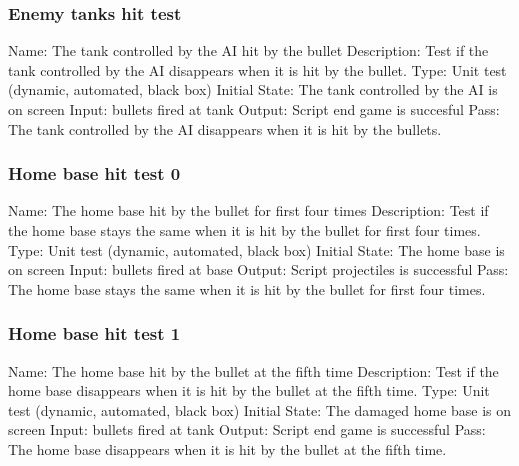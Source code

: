 \documentclass{article}
\begin{document}
\subsubsection{Enemy tanks hit test}
Name:  The tank controlled by the AI hit by the bullet\newline
Description: Test if the tank controlled by the AI disappears when it is hit 
by the bullet. \newline
Type: Unit test (dynamic, automated, black box) \newline
Initial State:  The tank controlled by the AI is on screen \newline
Input: bullets fired at tank\newline
Output: Script end game is succesful\newline
Pass: The tank controlled by the AI disappears when it is hit by the bullets.
\newline


\subsubsection{Home base hit test 0}
Name:  The home base hit by the bullet for first four times\newline
Description: Test if the home base stays the same when it is hit by the bullet 
for first four times. \newline
Type: Unit test (dynamic, automated, black box) \newline
Initial State:  The home base is on screen \newline
Input: bullets fired at base\newline
Output: Script projectiles is successful  \newline
Pass:  The home base stays the same when it is hit by the bullet for first 
four times. \newline


\subsubsection{Home base hit test 1}
Name: The home base hit by the bullet at the fifth time\newline
Description: Test if the home base disappears when it is hit by the bullet  at 
the fifth time. \newline
Type: Unit test (dynamic, automated, black box) \newline
Initial State:  The damaged home base is on screen \newline
Input: bullets fired at tank\newline
Output: Script end game is successful\newline
Pass: The home base disappears when it is hit by the bullet  at the fifth 
time. \newline
\end{document}
